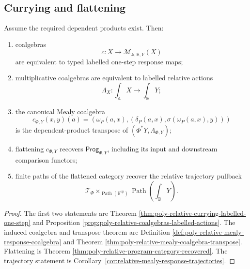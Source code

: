 \subsection{Currying and flattening}
\label{subsec:relative-response-currying-summary}

\begin{theorem}
\label{thm:relative-response-main-equivalence}
Assume the required dependent products exist.  Then:
\begin{enumerate}
    \item coalgebras
    \[
        c:X\to\mathcal M_{\mathbb A,\mathbb B,Y}(X)
    \]
    are equivalent to typed labelled one-step response maps;

    \item multiplicative coalgebras are equivalent to labelled relative
    actions
    \[
        \Lambda_X:\int_{\mathbb A}X\to\int_{\mathbb B}Y;
    \]

    \item the canonical Mealy coalgebra
    \[
        c_{\Phi,Y}(x,y)(a)
        =
        \left(
            \omega_P(a,x),
            \left(
                \delta_P(a,x),
                \sigma(\omega_P(a,x),y)
            \right)
        \right)
    \]
    is the dependent-product transpose of
    \((\Phi^{\ast}Y,\Lambda_{\Phi,Y})\);

    \item flattening \(c_{\Phi,Y}\) recovers
    \(\mathsf{Prog}_{\Phi,Y}\), including its input and downstream
    comparison functors;

    \item finite paths of the flattened category recover the relative
    trajectory pullback
    \[
        \mathscr T_\Phi
        \times_{\operatorname{Path}(\mathbb B^{\mathrm{op}})}
        \operatorname{Path}\!\left(\int_{\mathbb B}Y\right).
    \]
\end{enumerate}
\end{theorem}

\begin{proof}
The first two statements are Theorem
\ref{thm:poly-relative-currying-labelled-one-step} and Proposition
\ref{prop:poly-relative-coalgebras-labelled-actions}.  The induced coalgebra
and transpose theorem are Definition
\ref{def:poly-relative-mealy-response-coalgebra} and Theorem
\ref{thm:poly-relative-mealy-coalgebra-transpose}.  Flattening is Theorem
\ref{thm:poly-relative-program-category-recovered}.  The trajectory statement
is Corollary~\ref{cor:relative-mealy-response-trajectories}.
\end{proof}

